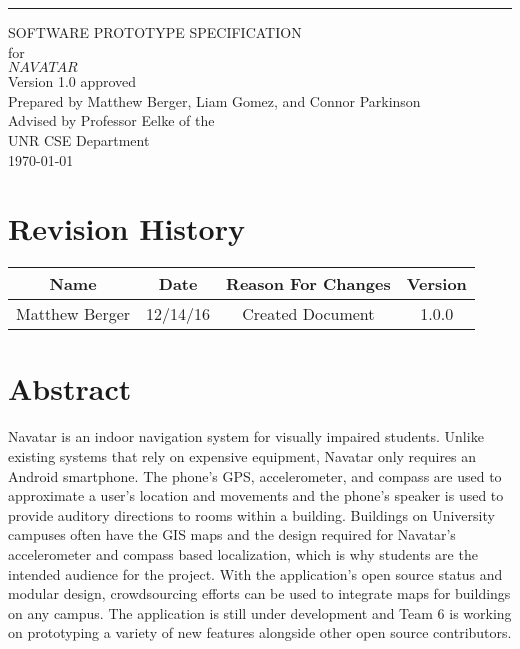 \documentclass{scrreprt}
\date{}
\def\myversion{1.0 }
\begin{document}
\begin{flushright}
    \rule{16cm}{5pt}\vskip1cm
    \begin{bfseries}
        \Huge{SOFTWARE PROTOTYPE SPECIFICATION}\\
        \vspace{1.6cm}
        for\\
        \vspace{1.6cm}
        $NAVATAR$\\
        \vspace{1.6cm}
        \LARGE{Version \myversion approved}\\
        \vspace{1.6cm}
        Prepared by Matthew Berger, Liam Gomez, and Connor Parkinson\\ 
        \vspace{1.6cm}
        Advised by Professor Eelke of the\\UNR CSE Department\\
        \vspace{1.6cm}
        \today\\
    \end{bfseries}
\end{flushright}

\tableofcontents

\chapter*{Revision History}

\begin{center}
    \begin{tabular}{|c|c|c|c|}
        \hline
	    Name & Date & Reason For Changes & Version\\
        \hline
	    Matthew Berger & 12/14/16 & Created Document & 1.0.0\\
        \hline
    \end{tabular}
\end{center}

\chapter{Abstract}
Navatar is an indoor navigation system for visually impaired students. Unlike existing systems that rely on expensive equipment, Navatar only requires an Android smartphone. The phone’s GPS, accelerometer, and compass are used to approximate a user's location and movements and the phone’s speaker is used to provide auditory directions to rooms within a building. Buildings on University campuses often have the GIS maps and the design required for Navatar’s accelerometer and compass based localization, which is why students are the intended audience for the project. With the application’s open source status and modular design, crowdsourcing efforts can be used to integrate maps for buildings on any campus. The application is still under development and Team 6 is working on prototyping a variety of new features alongside other open source contributors.
\end{document}
